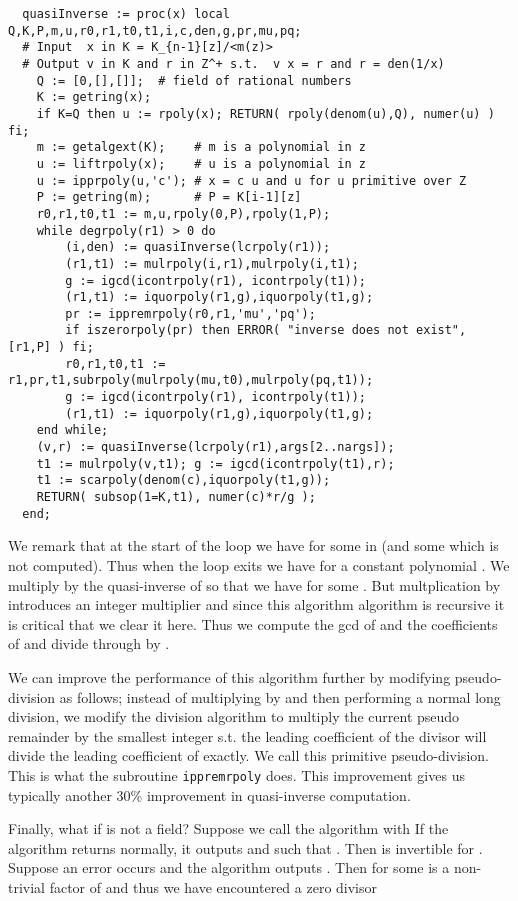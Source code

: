 \documentclass[10pt]{article}
\begin{document}
{ \small
\begin{verbatim}
  quasiInverse := proc(x) local Q,K,P,m,u,r0,r1,t0,t1,i,c,den,g,pr,mu,pq;
  # Input  x in K = K_{n-1}[z]/<m(z)>
  # Output v in K and r in Z^+ s.t.  v x = r and r = den(1/x)
    Q := [0,[],[]];  # field of rational numbers
    K := getring(x);
    if K=Q then u := rpoly(x); RETURN( rpoly(denom(u),Q), numer(u) ) fi;
    m := getalgext(K);    # m is a polynomial in z
    u := liftrpoly(x);    # u is a polynomial in z
    u := ipprpoly(u,'c'); # x = c u and u for u primitive over Z
    P := getring(m);      # P = K[i-1][z]
    r0,r1,t0,t1 := m,u,rpoly(0,P),rpoly(1,P);
    while degrpoly(r1) > 0 do
        (i,den) := quasiInverse(lcrpoly(r1));
        (r1,t1) := mulrpoly(i,r1),mulrpoly(i,t1);
        g := igcd(icontrpoly(r1), icontrpoly(t1));
        (r1,t1) := iquorpoly(r1,g),iquorpoly(t1,g);
        pr := ippremrpoly(r0,r1,'mu','pq');
        if iszerorpoly(pr) then ERROR( "inverse does not exist", [r1,P] ) fi;
        r0,r1,t0,t1 := r1,pr,t1,subrpoly(mulrpoly(mu,t0),mulrpoly(pq,t1));
        g := igcd(icontrpoly(r1), icontrpoly(t1));
        (r1,t1) := iquorpoly(r1,g),iquorpoly(t1,g);
    end while;
    (v,r) := quasiInverse(lcrpoly(r1),args[2..nargs]);
    t1 := mulrpoly(v,t1); g := igcd(icontrpoly(t1),r);
    t1 := scarpoly(denom(c),iquorpoly(t1,g));
    RETURN( subsop(1=K,t1), numer(c)*r/g );
  end;
\end{verbatim}
}
We remark that at the start of the loop we have  for
some  in  (and some  which is not computed).
Thus when the loop exits we have  for a constant
polynomial .
We multiply  by  the quasi-inverse of  so that we
have  for some .
But multplication by  introduces an integer multiplier and since this
algorithm algorithm is recursive it is critical that we clear it here.
Thus we compute  the gcd of  and the coefficients of  and divide
through by .

We can improve the performance of this algorithm further by
modifying pseudo-division as follows; instead of multiplying  by 
and then performing a normal long division, we modify the division algorithm to
multiply the current pseudo remainder  by the smallest integer s.t. the
leading coefficient of the divisor  will divide the leading coefficient of  exactly.
We call this primitive pseudo-division.
This is what the subroutine {\tt ippremrpoly} does.
This improvement gives us typically another 30\% improvement in quasi-inverse computation.

Finally, what if  is not a field?
Suppose we call the algorithm with 
If the algorithm returns normally, it outputs  and 
such that .  Then  is invertible for .
Suppose an error occurs and the algorithm outputs .
Then  for some  is a non-trivial
factor of  and thus we have encountered a zero divisor
\end{document}
